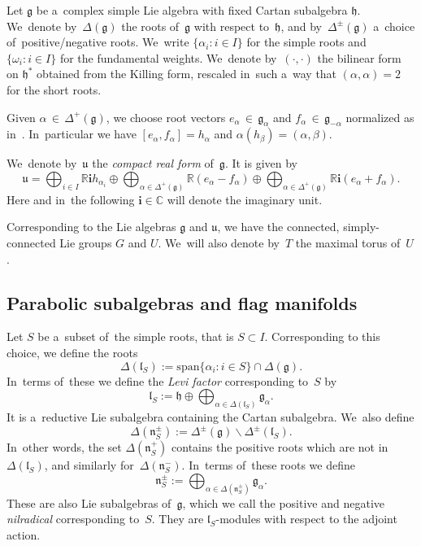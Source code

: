 \documentclass[10pt,a4paper]{amsart}
\numberwithin{equation}{section}
\newcommand{\lieg}{\mathfrak{g}}
\newcommand{\lieh}{\mathfrak{h}}
\newcommand{\liel}{\mathfrak{l}}
\newcommand{\lien}{\mathfrak{n}}
\newcommand{\lieu}{\mathfrak{u}}
\newcommand{\bbC}{\mathbb{C}}
\newcommand{\bbR}{\mathbb{R}}
\newcommand{\iu}{\boldsymbol{i}}
\begin{document}
Let $\lieg$ be a~complex simple Lie algebra with fixed Cartan subalgebra $\lieh$.
We~denote by~$\Delta(\lieg)$ the roots of~$\lieg$ with respect to~$\lieh$, and by~$\Delta^\pm(\lieg)$ a~choice of~positive/negative roots.
We~write $\{\alpha_i\colon i \in I\}$ for the simple roots and $\{\omega_i\colon i \in I\}$ for the fundamental weights.
We~denote by~$(\cdot, \cdot)$ the bilinear form on $\lieh^*$ obtained from the Killing form, rescaled in~such a~way that $(\alpha, \alpha) = 2$ for the short roots.

Given $\alpha \,{\in}\, \Delta^+(\lieg)$, we choose root vectors $e_\alpha \,{\in}\, \lieg_\alpha$ and $f_\alpha \,{\in}\, \lieg_{-\alpha}$ normalized as in~\cite[The\-o\-rem~6.6]{knapp}.
In~particular we have $[e_\alpha, f_\alpha] = h_\alpha$ and $\alpha(h_\beta) = (\alpha, \beta)$.

We~denote by~$\lieu$ the \emph{compact real form} of~$\lieg$. It is given by
\[
\lieu = \bigoplus_{i \in I} \bbR \iu h_{\alpha_i} \oplus \bigoplus_{\alpha \in \Delta^+(\lieg)} \bbR (e_\alpha - f_\alpha) \oplus \bigoplus_{\alpha \in \Delta^+(\lieg)} \bbR \iu (e_\alpha + f_\alpha).
\]
Here and in~the following $\iu \in \bbC$ will denote the imaginary unit.

Corresponding to the Lie algebras $\lieg$ and $\lieu$, we have the connected, simply-connected Lie groups $G$ and $U$.
We~will also denote by~$T$ the maximal torus of~$U$.

\subsection{Parabolic subalgebras and flag manifolds}

Let $S$ be a~subset of~the simple roots, that is $S \subset I$.
Corresponding to this choice, we define the roots
\[
\Delta(\liel_S) := \mathrm{span} \{ \alpha_i\colon i \in S \} \cap \Delta(\lieg).
\]
In~terms of~these we define the \emph{Levi factor} corresponding to~$S$ by
\[
\liel_S := \lieh \oplus \bigoplus_{\alpha \in \Delta(\liel_S)} \lieg_\alpha.
\]
It is a~reductive Lie subalgebra containing the Cartan subalgebra.
We~also define
\[
\Delta(\lien_S^\pm) := \Delta^\pm(\lieg) \backslash \Delta^\pm(\liel_S).
\]
In~other words, the set $\Delta(\lien_S^+)$ contains the positive roots which are not in~$\Delta(\liel_S)$, and similarly for~$\Delta(\lien_S^-)$.
In~terms of~these roots we define
\[
\lien_S^\pm := \bigoplus_{\alpha \in \Delta(\lien_S^\pm)} \lieg_\alpha.
\]
These are also Lie subalgebras of~$\lieg$, which we call the positive and negative \emph{nilradical} corresponding to~$S$.
They are $\liel_S$-modules with respect to the adjoint action.
\end{document}
